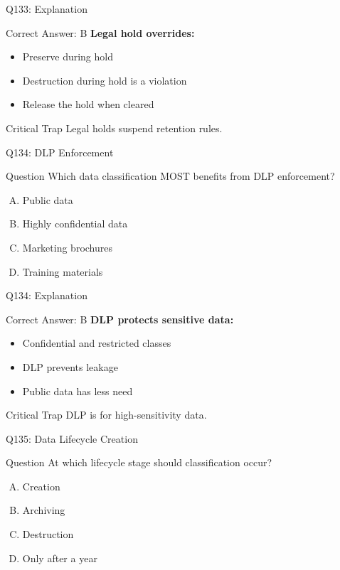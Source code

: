 \documentclass{beamer}
\begin{document}
	\begin{frame}{Q133: Explanation}
		\begin{block}{Correct Answer: B}
			\textbf{Legal hold overrides:}
			\begin{itemize}
				\item Preserve during hold
				\item Destruction during hold is a violation
				\item Release the hold when cleared
			\end{itemize}
		\end{block}
		\begin{alertblock}{Critical Trap}
			Legal holds suspend retention rules.
		\end{alertblock}
	\end{frame}
	
	\begin{frame}{Q134: DLP Enforcement}
		\begin{block}{Question}
			Which data classification MOST benefits from DLP enforcement?
		\end{block}
		\begin{enumerate}[(A)]
			\item Public data
			\item Highly confidential data
			\item Marketing brochures
			\item Training materials
		\end{enumerate}
	\end{frame}
	
	\begin{frame}{Q134: Explanation}
		\begin{block}{Correct Answer: B}
			\textbf{DLP protects sensitive data:}
			\begin{itemize}
				\item Confidential and restricted classes
				\item DLP prevents leakage
				\item Public data has less need
			\end{itemize}
		\end{block}
		\begin{alertblock}{Critical Trap}
			DLP is for high-sensitivity data.
		\end{alertblock}
	\end{frame}
	
	\begin{frame}{Q135: Data Lifecycle Creation}
		\begin{block}{Question}
			At which lifecycle stage should classification occur?
		\end{block}
		\begin{enumerate}[(A)]
			\item Creation
			\item Archiving
			\item Destruction
			\item Only after a year
		\end{enumerate}
	\end{frame}
	
\end{document}
